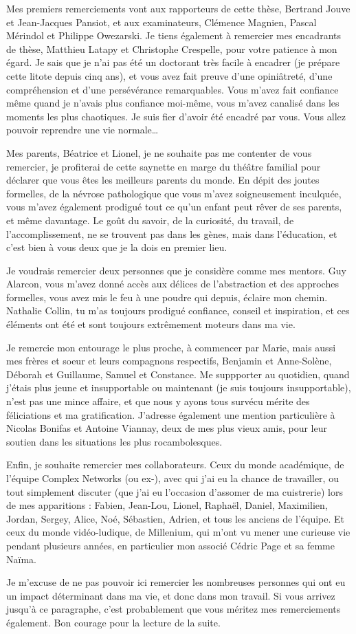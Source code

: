 
Mes premiers remerciements vont aux rapporteurs de cette thèse, Bertrand Jouve
et Jean-Jacques Pansiot, et aux examinateurs, Clémence Magnien, Pascal Mérindol
et Philippe Owezarski. Je tiens également à remercier mes encadrants de thèse,
Matthieu Latapy et Christophe Crespelle, pour votre patience à mon égard. Je
sais que je n'ai pas été un doctorant très facile à encadrer (je prépare cette
litote depuis cinq ans), et vous avez fait preuve d'une opiniâtreté, d'une
compréhension et d'une persévérance remarquables. Vous m'avez fait confiance
même quand je n'avais plus confiance moi-même, vous m'avez canalisé dans les moments
les plus chaotiques. Je suis fier d'avoir été encadré par vous. Vous allez
pouvoir reprendre une vie normale\ldots

Mes parents, Béatrice et Lionel, je ne souhaite pas me contenter de vous
remercier, je profiterai de cette saynette en marge du théâtre familial pour
déclarer que vous êtes les meilleurs parents du monde. En dépit des joutes
formelles, de la névrose pathologique que vous m'avez soigneusement inculquée,
vous m'avez également prodigué tout ce qu'un enfant peut rêver de ses parents,
et même davantage. Le goût du savoir, de la curiosité, du travail, de
l'accomplissement, ne se trouvent pas dans les gènes, mais dans l'éducation, et
c'est bien à vous deux que je la dois en premier lieu.

Je voudrais remercier deux personnes que je considère comme mes mentors. Guy
Alarcon, vous m'avez donné accès aux délices de l'abstraction et des approches
formelles, vous avez mis le feu à une poudre qui depuis, éclaire mon chemin.
Nathalie Collin, tu m'as toujours prodigué confiance, conseil et inspiration,
et ces éléments ont été et sont toujours extrêmement moteurs dans ma vie.

Je remercie mon entourage le plus proche, à commencer par Marie, mais aussi mes
frères et soeur et leurs compagnons respectifs, Benjamin et Anne-Solène, Déborah
et Guillaume, Samuel et Constance. Me suppporter au quotidien, quand j'étais
plus jeune et insupportable ou maintenant (je suis toujours insupportable),
n'est pas une mince affaire, et que nous y ayons tous survécu mérite des
féliciations et ma gratification. J'adresse également une mention particulière à
Nicolas Bonifas et Antoine Viannay, deux de mes plus vieux amis, pour leur
soutien dans les situations les plus rocambolesques.

Enfin, je souhaite remercier mes collaborateurs. Ceux du monde académique, de
l'équipe Complex Networks (ou ex-), avec qui j'ai eu la chance de travailler, ou
tout simplement discuter (que j'ai eu l'occasion d'assomer de ma cuistrerie)
lors de mes apparitions : Fabien, Jean-Lou, Lionel, Raphaël, Daniel, Maximilien,
Jordan, Sergey, Alice, Noé, Sébastien, Adrien, et tous les anciens de l'équipe.
Et ceux du monde vidéo-ludique, de Millenium, qui m'ont vu mener une curieuse vie
pendant plusieurs années, en particulier mon associé Cédric Page et sa femme
Naïma.

Je m'excuse de ne pas pouvoir ici remercier les nombreuses personnes qui ont eu
un impact déterminant dans ma vie, et donc dans mon travail. Si vous arrivez
jusqu'à ce paragraphe, c'est probablement que vous méritez mes remerciements
également. Bon courage pour la lecture de la suite.
